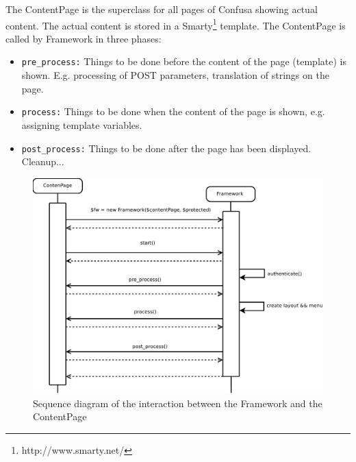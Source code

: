 \documentclass{scrartcl}
\begin{document}
The ContentPage is the superclass for all pages of Confusa showing actual content. The actual content is stored in a Smarty\footnote{http://www.smarty.net/} template. The ContentPage is called by Framework in three phases:

\begin{itemize}
	\item \verb+pre_process:+ Things to be done before the content of the page (template) is shown. E.g. processing of POST parameters, translation of strings on the page.
	\item \verb+process:+ Things to be done when the content of the page is shown, e.g. assigning template variables.
	\item \verb+post_process:+ Things to be done after the page has been displayed. Cleanup...
\end{itemize}

\begin{figure}\label{fig_seq_fw}
	\begin{center}
	\includegraphics[width=\textwidth]{seq_fw}
	\caption{Sequence diagram of the interaction between the Framework and the ContentPage}
	\end{center}
\end{figure}
\end{document}
